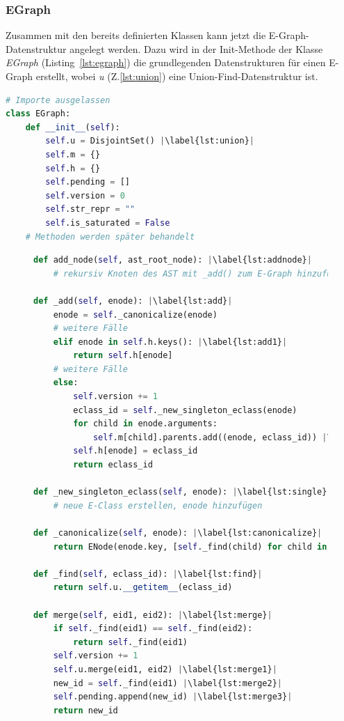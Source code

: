 \subsubsection{EGraph}

Zusammen mit den bereits definierten Klassen kann jetzt die E-Graph-Datenstruktur angelegt werden. Dazu wird in der Init-Methode der Klasse \textit{EGraph} (Listing~\ref{lst:egraph})
die grundlegenden Datenstrukturen für einen E-Graph erstellt, wobei \textit{u} (Z.\ref{lst:union}) eine Union-Find-Datenstruktur ist.

\begin{lstlisting}[language=Python, escapechar=|, caption=Auszug aus der Klasse \textit{EGraph}, label={lst:egraph}]
# Importe ausgelassen 
class EGraph:
    def __init__(self):
        self.u = DisjointSet() |\label{lst:union}|
        self.m = {}
        self.h = {}
        self.pending = []
        self.version = 0
        self.str_repr = ""
        self.is_saturated = False
    # Methoden werden später behandelt
\end{lstlisting} 


\begin{figure}
\vspace{-5mm}
\hspace{3mm}
\begin{minipage}[t]{\linewidth}
\begin{lstlisting}[language=Python, escapechar=|, caption=Methoden der Klasse \textit{EGraph}, label={lst:methods1}]
def add_node(self, ast_root_node): |\label{lst:addnode}|
    # rekursiv Knoten des AST mit _add() zum E-Graph hinzufügen 

def _add(self, enode): |\label{lst:add}|
    enode = self._canonicalize(enode)
    # weitere Fälle 
    elif enode in self.h.keys(): |\label{lst:add1}|
        return self.h[enode]
    # weitere Fälle 
    else:
        self.version += 1
        eclass_id = self._new_singleton_eclass(enode)
        for child in enode.arguments:
            self.m[child].parents.add((enode, eclass_id)) |\label{lst:add2}|
        self.h[enode] = eclass_id
        return eclass_id

def _new_singleton_eclass(self, enode): |\label{lst:single}|
    # neue E-Class erstellen, enode hinzufügen
    
def _canonicalize(self, enode): |\label{lst:canonicalize}|
    return ENode(enode.key, [self._find(child) for child in enode.arguments])

def _find(self, eclass_id): |\label{lst:find}|
    return self.u.__getitem__(eclass_id)

def merge(self, eid1, eid2): |\label{lst:merge}|
    if self._find(eid1) == self._find(eid2):
        return self._find(eid1)
    self.version += 1
    self.u.merge(eid1, eid2) |\label{lst:merge1}|
    new_id = self._find(eid1) |\label{lst:merge2}|
    self.pending.append(new_id) |\label{lst:merge3}|
    return new_id
\end{lstlisting} 
\end{minipage}
\end{figure}

